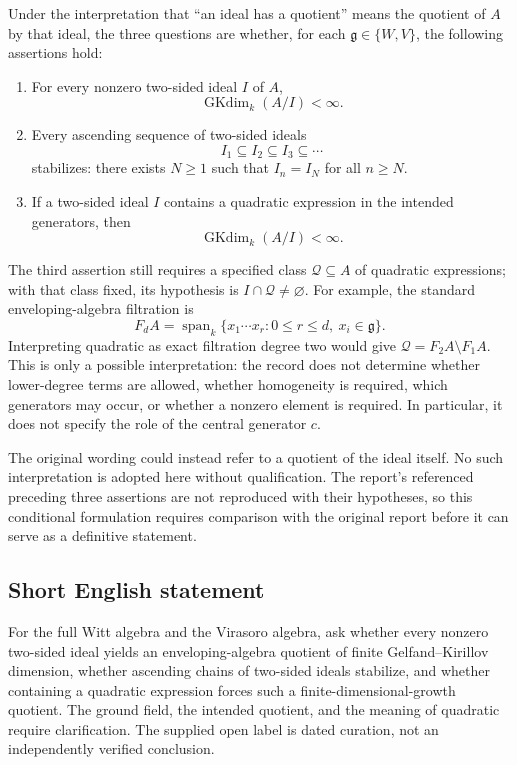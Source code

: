 \documentclass[11pt]{article}
\begin{document}
Under the interpretation that ``an ideal has a quotient'' means the quotient of \(A\) by that ideal, the three questions are whether, for each \(\mathfrak g\in\{W,V\}\), the following assertions hold:
\begin{enumerate}
\item For every nonzero two-sided ideal \(I\) of \(A\),
\[
\operatorname{GKdim}_k(A/I)<\infty.
\]
\item Every ascending sequence of two-sided ideals
\[
I_1\subseteq I_2\subseteq I_3\subseteq\cdots
\]
stabilizes: there exists \(N\geq1\) such that \(I_n=I_N\) for all \(n\geq N\).
\item If a two-sided ideal \(I\) contains a quadratic expression in the intended generators, then
\[
\operatorname{GKdim}_k(A/I)<\infty.
\]
\end{enumerate}
The third assertion still requires a specified class \(\mathcal Q\subseteq A\) of quadratic expressions; with that class fixed, its hypothesis is \(I\cap\mathcal Q\neq\varnothing\). For example, the standard enveloping-algebra filtration is
\[
F_dA=\operatorname{span}_k\{x_1\cdots x_r:0\leq r\leq d,\ x_i\in\mathfrak g\}.
\]
Interpreting quadratic as exact filtration degree two would give \(\mathcal Q=F_2A\setminus F_1A\). This is only a possible interpretation: the record does not determine whether lower-degree terms are allowed, whether homogeneity is required, which generators may occur, or whether a nonzero element is required. In particular, it does not specify the role of the central generator \(c\).

The original wording could instead refer to a quotient of the ideal itself. No such interpretation is adopted here without qualification. The report's referenced preceding three assertions are not reproduced with their hypotheses, so this conditional formulation requires comparison with the original report before it can serve as a definitive statement.
\subsection{Short English statement}
For the full Witt algebra and the Virasoro algebra, ask whether every nonzero two-sided ideal yields an enveloping-algebra quotient of finite Gelfand--Kirillov dimension, whether ascending chains of two-sided ideals stabilize, and whether containing a quadratic expression forces such a finite-dimensional-growth quotient. The ground field, the intended quotient, and the meaning of quadratic require clarification. The supplied open label is dated curation, not an independently verified conclusion.
\end{document}
